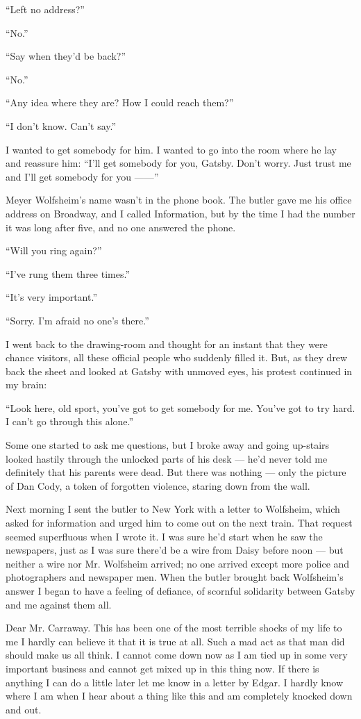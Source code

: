 \documentclass{znotebook}
\begin{document}
``Left no address?''

``No.''

``Say when they'd be back?''

``No.''

``Any idea where they are? How I could reach them?''

``I don't know. Can't say.''

I wanted to get somebody for him. I wanted to go into the room where he lay and reassure him: ``I'll get somebody for you, Gatsby. Don't worry. Just trust me and I'll get somebody for you ——''

Meyer Wolfsheim's name wasn't in the phone book. The butler gave me his office address on Broadway, and I called Information, but by the time I had the number it was long after five, and no one answered the phone.

``Will you ring again?''

``I've rung them three times.''

``It's very important.''

``Sorry. I'm afraid no one's there.''

I went back to the drawing-room and thought for an instant that they were chance visitors, all these official people who suddenly filled it. But, as they drew back the sheet and looked at Gatsby with unmoved eyes, his protest continued in my brain:

``Look here, old sport, you've got to get somebody for me. You've got to try hard. I can't go through this alone.''

Some one started to ask me questions, but I broke away and going up-stairs looked hastily through the unlocked parts of his desk — he'd never told me definitely that his parents were dead. But there was nothing — only the picture of Dan Cody, a token of forgotten violence, staring down from the wall.

Next morning I sent the butler to New York with a letter to Wolfsheim, which asked for information and urged him to come out on the next train. That request seemed superfluous when I wrote it. I was sure he'd start when he saw the newspapers, just as I was sure there'd be a wire from Daisy before noon — but neither a wire nor Mr. Wolfsheim arrived; no one arrived except more police and photographers and newspaper men. When the butler brought back Wolfsheim's answer I began to have a feeling of defiance, of scornful solidarity between Gatsby and me against them all.

Dear Mr. Carraway. This has been one of the most terrible shocks of my life to me I hardly can believe it that it is true at all. Such a mad act as that man did should make us all think. I cannot come down now as I am tied up in some very important business and cannot get mixed up in this thing now. If there is anything I can do a little later let me know in a letter by Edgar. I hardly know where I am when I hear about a thing like this and am completely knocked down and out.
\end{document}
